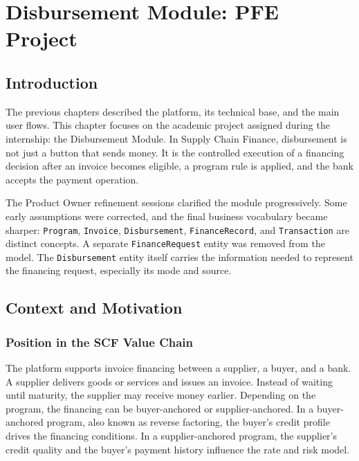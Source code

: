 \chapter{Disbursement Module: PFE Project}
\label{chap:disbursement_module}

\section{Introduction}
\label{sec:ch5_introduction}

The previous chapters described the platform, its technical base, and the main user flows. This chapter focuses on the academic project assigned during the internship: the Disbursement Module. In Supply Chain Finance, disbursement is not just a button that sends money. It is the controlled execution of a financing decision after an invoice becomes eligible, a program rule is applied, and the bank accepts the payment operation.

The Product Owner refinement sessions clarified the module progressively. Some early assumptions were corrected, and the final business vocabulary became sharper: \texttt{Program}, \texttt{Invoice}, \texttt{Disbursement}, \texttt{FinanceRecord}, and \texttt{Transaction} are distinct concepts. A separate \texttt{FinanceRequest} entity was removed from the model. The \texttt{Disbursement} entity itself carries the information needed to represent the financing request, especially its mode and source.

\section{Context and Motivation}
\label{sec:ch5_context_motivation}

\subsection{Position in the SCF Value Chain}
\label{subsec:ch5_value_chain}

The platform supports invoice financing between a supplier, a buyer, and a bank. A supplier delivers goods or services and issues an invoice. Instead of waiting until maturity, the supplier may receive money earlier. Depending on the program, the financing can be buyer-anchored or supplier-anchored. In a buyer-anchored program, also known as reverse factoring, the buyer's credit profile drives the financing conditions. In a supplier-anchored program, the supplier's credit quality and the buyer's payment history influence the rate and risk model.

